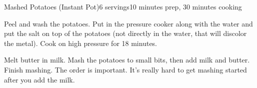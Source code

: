 \documentclass[../Cookbook.tex]{subfiles}
\begin{document}
\begin{recipe}[MashedPotatoesInstantPot]{Mashed Potatoes (Instant Pot)}{6 servings}{10 minutes prep, 30 minutes cooking}

	Peel and wash the potatoes.
	Put in the pressure cooker along with the water and put the salt on top of the potatoes (not directly in the water, that will discolor the metal).
	Cook on high pressure for 18 minutes.

	Melt butter in milk. Mash the potatoes to small bits, then add milk and butter. Finish mashing.
	The order is important. It's really hard to get mashing started after you add the milk.

\end{recipe}
\end{document}
